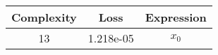 \begin{center}
        \begin{tabular}{|c|c|c|}
        \hline
        Complexity & Loss & Expression \\
        \hline
        13 & 1.218e-05 & $\begin{aligned}x_{0}\end{aligned}$\\ \hline\end{tabular}
        \end{center}
        